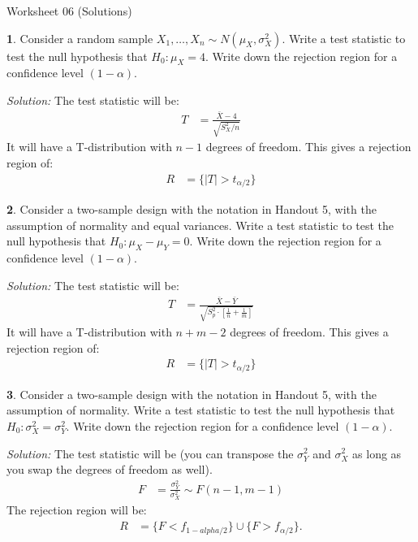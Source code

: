 \documentclass{tufte-handout}
\begin{document}
\justify

{\LARGE Worksheet 06 (Solutions)}

\vspace*{18pt}


\textbf{1}. Consider a random sample $X_1, \ldots, X_n \sim N(\mu_X, \sigma^2_X)$. 
Write a test statistic to test the null hypothesis that $H_0: \mu_X = 4$.
Write down the rejection region for a confidence level 
$(1 - \alpha)$. 

\textit{Solution:} The test statistic will be:
\begin{align*}
T &= \frac{\bar{X} - 4}{\sqrt{S^2_X / n}}
\end{align*}
It will have a T-distribution with $n-1$ degrees of freedom. This gives
a rejection region of:
\begin{align*}
R &= \{ |T| > t_{\alpha/2} \}
\end{align*}

\textbf{2}. Consider a two-sample design with the notation in Handout 5, with the assumption
of normality and equal variances. Write a test statistic to test the null
hypothesis that $H_0: \mu_X - \mu_Y = 0$. Write down the
rejection region for a confidence level  $(1 - \alpha)$.

\textit{Solution:} The test statistic will be:
\begin{align*}
T &= \frac{\bar{X} - \bar{Y}}{\sqrt{S^2_p \cdot \left[ \frac{1}{n} + \frac{1}{m} \right]}}
\end{align*}
It will have a T-distribution with $n + m - 2$ degrees of freedom. This gives
a rejection region of:
\begin{align*}
R &= \{ |T| > t_{\alpha/2} \}
\end{align*}

\textbf{3}. Consider a two-sample design with the notation in Handout 5, with the assumption
of normality. Write a test statistic to test the null
hypothesis that $H_0: \sigma_X^2 = \sigma_Y^2$. Write down the
rejection region for a confidence level  $(1 - \alpha)$.

\textit{Solution:} The test statistic will be (you can transpose the $\sigma_Y^2$
and $\sigma_X^2$ as long as you swap the degrees of freedom as
well).
\begin{align*}
F &= \frac{\sigma_Y^2}{\sigma_X^2} \sim F(n-1, m-1)
\end{align*}
The rejection region will be:
\begin{align*}
R &= \{ F < f_{1-alpha/2} \} \cup \{ F > f_{\alpha/2} \}.
\end{align*}
\end{document}
